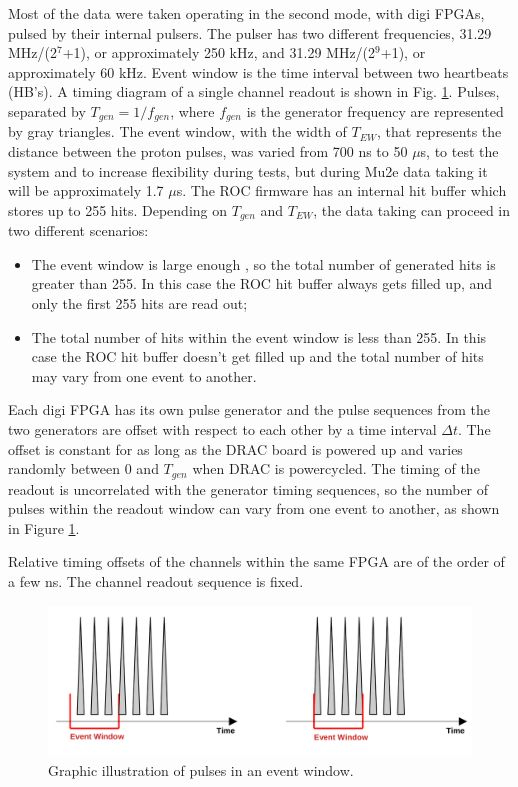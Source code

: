     Most of the data were taken operating in the second mode, with digi FPGAs, pulsed by their internal pulsers.
    The pulser has two different frequencies,  31.29 MHz/(2$^7$+1), or approximately 250 kHz, 
    and 31.29 MHz/(2$^9$+1), or approximately 60 kHz.
    Event window is the time interval between two heartbeats (HB's). 
    A timing diagram of a single channel readout is shown in Fig. \ref{fig:3}.
    Pulses, separated by $T_{gen}=1/f_{gen}$, where $f_{gen}$ is the generator frequency
    are represented by gray triangles.
    The event window, with the width of $T_{EW}$, that represents the distance between the proton pulses, 
    was varied from 700 ns to 50 $\mu$s, to test the system and to increase flexibility during tests, but during Mu2e data taking it will be approximately 1.7 $\mu$s. 
    The ROC firmware has an internal hit buffer which stores up to 255 hits.
    Depending on $T_{gen}$ and $T_{EW}$, the data taking can proceed in two different
    scenarios:
    \begin{itemize}
    \item
      The event window is large enough , so the total number of generated hits is greater than 255. In this case
      the ROC hit buffer always gets filled up, and only the first 255 hits are read out;
    \item
      The total number of hits within the event window is less than 255.
      In this case the ROC hit buffer doesn't get filled up and the total number of hits may vary from one event to another.
    \end{itemize}
    
    Each digi FPGA has its own pulse generator and the pulse sequences from the two
    generators are offset with respect to each other by a time interval $\Delta t$.
    The offset is constant for as long as the DRAC board is powered up and varies randomly between 0 and $T_{gen}$ when DRAC is powercycled.
    The timing of the readout is uncorrelated with the generator timing sequences,
      so the number of pulses within the readout window can vary from one event to another, as shown
      in Figure \ref{fig:3}.
    
    Relative timing offsets of the channels within the same FPGA are of the order of a few ns.
    The channel readout sequence is fixed.
    
    \begin{figure}[!h]
    \centering
    \includegraphics[width =\textwidth]{figures/png/finalimg.png}
    \caption{Graphic illustration of pulses in an event window.}
    \label{fig:3}
    \end{figure}
    
